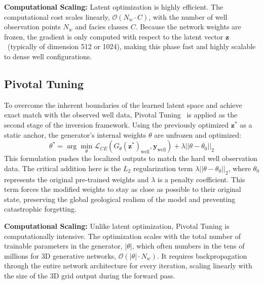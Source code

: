 \textbf{Computational Scaling:} Latent optimization is highly efficient. The computational cost scales linearly, $\mathcal{O}(N_{w} \cdot C)$, with the number of well observation points $N_{w}$ and facies classes $C$. Because the network weights are frozen, the gradient is only computed with respect to the latent vector $\mathbf{z}$~(typically of dimension 512 or 1024), making this phase fast and highly scalable to dense well configurations.

\subsection{Pivotal Tuning}
To overcome the inherent boundaries of the learned latent space and achieve exact match with the observed well data, Pivotal Tuning~\parencite{roich2022pivotal} is applied as the second stage of the inversion framework. Using the previously optimized $\mathbf{z}^*$ as a static anchor, the generator's internal weights $\theta$ are unfrozen and optimized:
\begin{equation}\label{eq:pivotal}
    \theta^* = \arg\min_{\theta} \mathcal{L}_{CE}(G_\theta(\mathbf{z}^*)_{\text{well}}, \mathbf{y}_{\text{well}}) + \lambda ||\theta - \theta_0||_2
\end{equation}
This formulation pushes the localized outputs to match the hard well observation data. The critical addition here is the $L_2$ regularization term $\lambda ||\theta - \theta_0||_2$, where $\theta_0$ represents the original pre-trained weights and $\lambda$ is a penalty coefficient. This term forces the modified weights to stay as close as possible to their original state, preserving the global geological realism of the model and preventing catastrophic forgetting.

\textbf{Computational Scaling:} Unlike latent optimization, Pivotal Tuning is computationally intensive. The optimization scales with the total number of trainable parameters in the generator, $|\theta|$, which often numbers in the tens of millions for 3D generative networks, $\mathcal{O}(|\theta| \cdot N_{w})$. It requires backpropagation through the entire network architecture for every iteration, scaling linearly with the size of the 3D grid output during the forward pass.